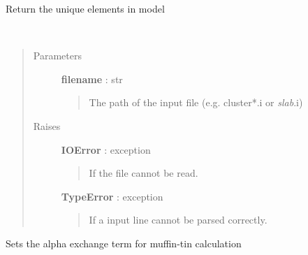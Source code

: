 \documentclass[letterpaper,10pt,english]{sphinxmanual}
\begin{document}
\begin{fulllineitems}
\begin{fulllineitems}
\end{fulllineitems}


\begin{fulllineitems}
\label{modules:phaseshifts.model.MTZ_model.get_elements}
Return the unique elements in model

\end{fulllineitems}


\begin{fulllineitems}
\label{modules:phaseshifts.model.MTZ_model.load_from_file}~\begin{quote}\begin{description}
\item[{Parameters}] \leavevmode
\textbf{filename} : str
\begin{quote}

The path of the input file (e.g. cluster*.i or \emph{slab}.i)
\end{quote}

\item[{Raises}] \leavevmode
\textbf{IOError} : exception
\begin{quote}

If the file cannot be read.
\end{quote}

\textbf{TypeError} : exception
\begin{quote}

If a input line cannot be parsed correctly.
\end{quote}

\end{description}\end{quote}

\end{fulllineitems}


\begin{fulllineitems}
\label{modules:phaseshifts.model.MTZ_model.set_exchange}
Sets the alpha exchange term for muffin-tin calculation

\end{fulllineitems}


\end{fulllineitems}
\end{document}
